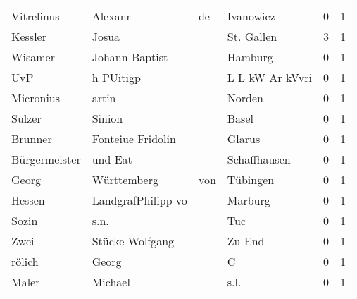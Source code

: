 \documentclass[10pt,a4paper,landscape]{article}
\begin{document}
\begin{longtable}{llllrr}
               Vitrelinus &                            Alexanr &          de &                                   Ivanowicz &          0 &         1 \\
                  Kessler &                              Josua &             &                                  St. Gallen &          3 &         1 \\
                  Wisamer &                     Johann Baptist &             &                                     Hamburg &          0 &         1 \\
                      UvP &                          h PUitigp &             &                             L L kW Ar kVvri &          0 &         1 \\
                Micronius &                              artin &             &                                      Norden &          0 &         1 \\
                   Sulzer &                             Sinion &             &                                       Basel &          0 &         1 \\
                  Brunner &                  Fonteiue Fridolin &             &                                      Glarus &          0 &         1 \\
            Bürgermeister &                            und Eat &             &                                Schaffhausen &          0 &         1 \\
                    Georg &                        Württemberg &         von &                                    Tübingen &          0 &         1 \\
                   Hessen &                 LandgrafPhilipp vo &             &                                     Marburg &          0 &         1 \\
                    Sozin &                               s.n. &             &                                         Tuc &          0 &         1 \\
                     Zwei &                    Stücke Wolfgang &             &                                      Zu End &          0 &         1 \\
                   rölich &                              Georg &             &                                           C &          0 &         1 \\
                    Maler &                            Michael &             &                                        s.l. &          0 &         1 \\

\end{longtable}
\end{document}
